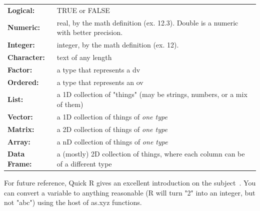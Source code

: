 \documentclass{report}
\newcommand{\code}[1]{\textsf{\ttfamily #1}}
\begin{document}
		\begin{tcolorbox}[title=R types]
			\begin{tabularx}{\textwidth}{>{\bfseries}l X}
Logical: & TRUE or FALSE\\[0.2cm]
Numeric: & real, by the math definition (ex. 12.3). Double is a numeric with better precision.\\[0.2cm]
Integer: & integer, by the math definition (ex. 12).\\[0.2cm]
Character: & text of any length\\[0.2cm]
Factor: & a type that represents a \gls{dv}\\[0.2cm]
Ordered: & a type that represents an \gls{ov}\\[0.2cm]
List: & a 1D collection of "things" (may be strings, numbers, or a mix of them)\\[0.2cm]
Vector: & a 1D collection of things of \emph{one type}\\[0.2cm]
Matrix: & a 2D collection of things of \emph{one type}\\[0.2cm]
Array: & a nD collection of things of \emph{one type}\\[0.2cm]
Data Frame: & a (mostly) 2D collection of things, where each column can be of a different type
			\end{tabularx}
			For future reference, Quick R gives an excellent introduction on the subject~\cite{quickr}. You can convert a variable to anything reasonable (R will turn "2" into an integer, but not "abc") using the host of \code{as.xyz} functions.
		\end{tcolorbox}
\end{document}
